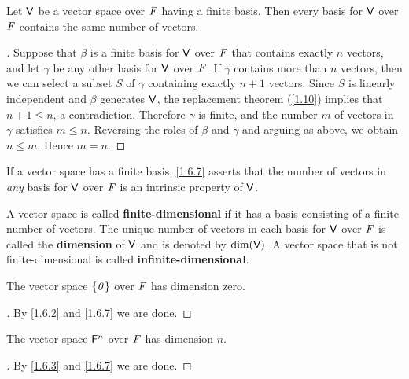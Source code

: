 \begin{cor}\label{1.6.7}
	Let \(\mathsf{V}\) be a vector space over \(\mathit{F}\) having a finite basis.
	Then every basis for \(\mathsf{V}\) over \(\mathit{F}\) contains the same number of vectors.
\end{cor}

\begin{proof}[]
	Suppose that \(\beta\) is a finite basis for \(\mathsf{V}\) over \(\mathit{F}\) that contains exactly \(n\) vectors, and let \(\gamma\) be any other basis for \(\mathsf{V}\) over \(\mathit{F}\).
	If \(\gamma\) contains more than \(n\) vectors, then we can select a subset \(S\) of \(\gamma\) containing exactly \(n + 1\) vectors.
	Since \(S\) is linearly independent and \(\beta\) generates \(\mathsf{V}\), the replacement theorem (\cref{1.10}) implies that \(n + 1 \leq n\), a contradiction.
	Therefore \(\gamma\) is finite, and the number \(m\) of vectors in \(\gamma\) satisfies \(m \leq n\).
	Reversing the roles of \(\beta\) and \(\gamma\) and arguing as above, we obtain \(n \leq m\).
	Hence \(m = n\).
\end{proof}

\begin{note}
	If a vector space has a finite basis, \cref{1.6.7} asserts that the number of vectors in \emph{any} basis for \(\mathsf{V}\) over \(\mathit{F}\) is an intrinsic property of \(\mathsf{V}\).
\end{note}

\begin{defn}\label{1.6.8}
	A vector space is called \textbf{finite-dimensional} if it has a basis consisting of a finite number of vectors.
	The unique number of vectors in each basis for \(\mathsf{V}\) over \(\mathit{F}\) is called the \textbf{dimension} of \(\mathsf{V}\) and is denoted by \(\dim(\mathsf{V})\).
	A vector space that is not finite-dimensional is called \textbf{infinite-dimensional}.
\end{defn}

\begin{eg}\label{1.6.9}
	The vector space \(\left\lbrace\mathit{0}\right\rbrace\) over \(\mathit{F}\) has dimension zero.
\end{eg}

\begin{proof}[]
	By \cref{1.6.2} and \cref{1.6.7} we are done.
\end{proof}

\begin{eg}\label{1.6.10}
	The vector space \(\mathsf{F}^n\) over \(\mathit{F}\) has dimension \(n\).
\end{eg}

\begin{proof}[]
	By \cref{1.6.3} and \cref{1.6.7} we are done.
\end{proof}

